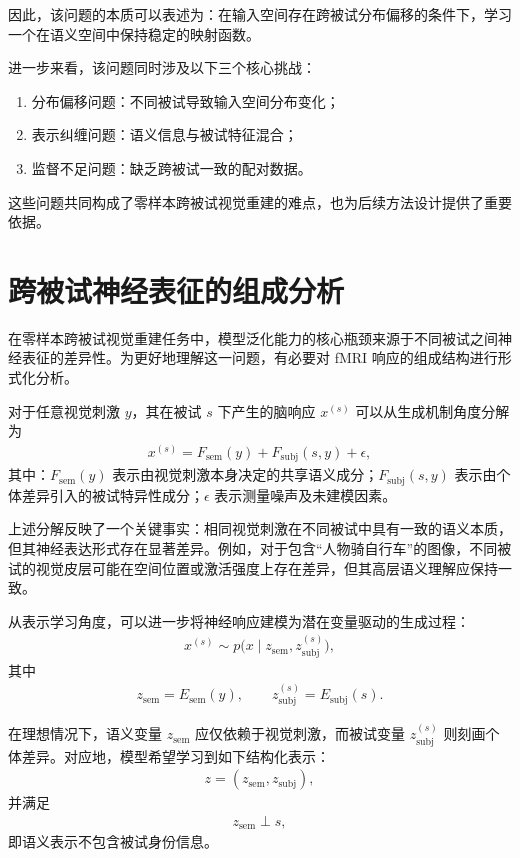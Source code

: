 因此，该问题的本质可以表述为：在输入空间存在跨被试分布偏移的条件下，学习一个在语义空间中保持稳定的映射函数。

进一步来看，该问题同时涉及以下三个核心挑战：
\begin{enumerate}
  \item 分布偏移问题：不同被试导致输入空间分布变化；
  \item 表示纠缠问题：语义信息与被试特征混合；
  \item 监督不足问题：缺乏跨被试一致的配对数据。
\end{enumerate}

这些问题共同构成了零样本跨被试视觉重建的难点，也为后续方法设计提供了重要依据。

\section{跨被试神经表征的组成分析}

在零样本跨被试视觉重建任务中，模型泛化能力的核心瓶颈来源于不同被试之间神经表征的差异性。为更好地理解这一问题，有必要对 fMRI 响应的组成结构进行形式化分析。

对于任意视觉刺激 $y$，其在被试 $s$ 下产生的脑响应 $x^{(s)}$ 可以从生成机制角度分解为
\begin{align}
  x^{(s)} = F_{\mathrm{sem}}(y) + F_{\mathrm{subj}}(s,y) + \epsilon,
\end{align}
其中：$F_{\mathrm{sem}}(y)$ 表示由视觉刺激本身决定的共享语义成分；$F_{\mathrm{subj}}(s,y)$ 表示由个体差异引入的被试特异性成分；$\epsilon$ 表示测量噪声及未建模因素。

上述分解反映了一个关键事实：相同视觉刺激在不同被试中具有一致的语义本质，但其神经表达形式存在显著差异。例如，对于包含“人物骑自行车”的图像，不同被试的视觉皮层可能在空间位置或激活强度上存在差异，但其高层语义理解应保持一致。

从表示学习角度，可以进一步将神经响应建模为潜在变量驱动的生成过程：
\begin{align}
  x^{(s)} \sim p\bigl(x \mid z_{\mathrm{sem}}, z_{\mathrm{subj}}^{(s)}\bigr),
\end{align}
其中
\begin{align}
  z_{\mathrm{sem}} = E_{\mathrm{sem}}(y), \qquad z_{\mathrm{subj}}^{(s)} = E_{\mathrm{subj}}(s).
\end{align}

在理想情况下，语义变量 $z_{\mathrm{sem}}$ 应仅依赖于视觉刺激，而被试变量 $z_{\mathrm{subj}}^{(s)}$ 则刻画个体差异。对应地，模型希望学习到如下结构化表示：
\begin{align}
  z = (z_{\mathrm{sem}}, z_{\mathrm{subj}}),
\end{align}
并满足
\begin{align}
  z_{\mathrm{sem}} \perp s,
\end{align}
即语义表示不包含被试身份信息。

